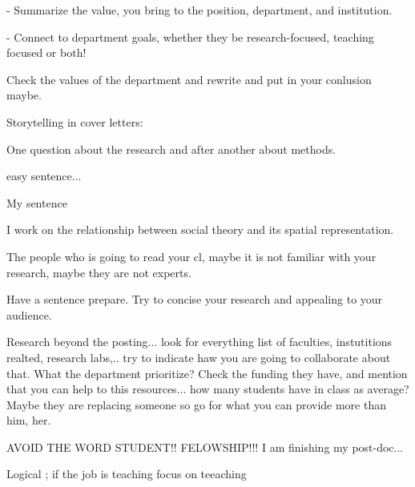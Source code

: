 - Summarize the value, you bring to the position, department, and institution.

- Connect to department goals, whether they be research-focused, teaching focused or both!

Check the values of the department and rewrite and put in your conlusion maybe.


Storytelling in cover letters:

One question about the research and after another about methods.

easy sentence... 

My sentence

I work on the relationship between social theory and its spatial representation.

The people who is going to read your cl, maybe it is not familiar with your research, maybe they are not experts. 

Have a sentence prepare. Try to concise your research and appealing to your audience. 


Research beyond the posting... look for everything list of faculties, instutitions realted, research labs,.. try to indicate haw you are going to collaborate about that.  What the department prioritize? Check the funding they have, and mention that you can help to this resources... how many students have in class as average? Maybe they are replacing someone so go for what you can provide more than him, her.

AVOID THE WORD STUDENT!! FELOWSHIP!!!  I am finishing my post-doc...



Logical ; if the job is teaching focus on teeaching

















